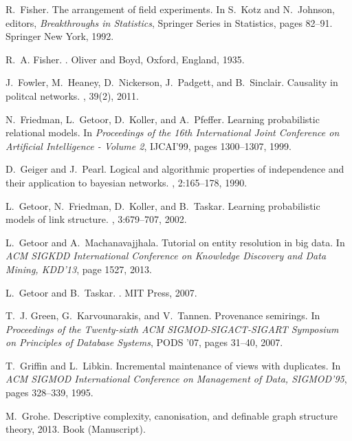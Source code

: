 \begin{thebibliography}{10}
R.~Fisher.
\newblock The arrangement of field experiments.
\newblock In S.~Kotz and N.~Johnson, editors, {\em Breakthroughs in
  Statistics}, Springer Series in Statistics, pages 82--91. Springer New York,
  1992.

R.~A. Fisher.
.
\newblock Oliver and Boyd, Oxford, England, 1935.

J.~Fowler, M.~Heaney, D.~Nickerson, J.~Padgett, and B.~Sinclair.
\newblock Causality in politcal networks.
, 39(2), 2011.

N.~Friedman, L.~Getoor, D.~Koller, and A.~Pfeffer.
\newblock Learning probabilistic relational models.
\newblock In {\em Proceedings of the 16th International Joint Conference on
  Artificial Intelligence - Volume 2}, IJCAI'99, pages 1300--1307, 1999.

D.~Geiger and J.~Pearl.
\newblock Logical and algorithmic properties of independence and their
  application to bayesian networks.
, 2:165--178, 1990.

L.~Getoor, N.~Friedman, D.~Koller, and B.~Taskar.
\newblock Learning probabilistic models of link structure.
, 3:679--707, 2002.

L.~Getoor and A.~Machanavajjhala.
\newblock Tutorial on entity resolution in big data.
\newblock In {\em ACM SIGKDD International Conference on Knowledge Discovery
  and Data Mining, KDD'13}, page 1527, 2013.

L.~Getoor and B.~Taskar.
.
\newblock MIT Press, 2007.

T.~J. Green, G.~Karvounarakis, and V.~Tannen.
\newblock Provenance semirings.
\newblock In {\em Proceedings of the Twenty-sixth ACM SIGMOD-SIGACT-SIGART
  Symposium on Principles of Database Systems}, PODS '07, pages 31--40, 2007.

T.~Griffin and L.~Libkin.
\newblock Incremental maintenance of views with duplicates.
\newblock In {\em {ACM} {SIGMOD} International Conference on Management of
  Data, SIGMOD'95}, pages 328--339, 1995.

M.~Grohe.
\newblock Descriptive complexity, canonisation, and definable graph structure
  theory, 2013.
\newblock Book (Manuscript).


\end{thebibliography}
